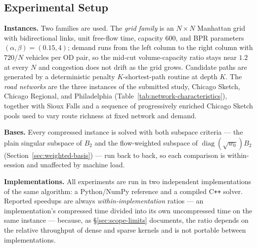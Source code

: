 \documentclass[11pt]{article}
\newif\ifshownotes \shownotesfalse
\newcommand{\conote}[1]{\ifshownotes{\color{red}\small\textsf{[Note to co-authors: #1]}}\fi}
\begin{document}
\conote{This section is a full rewrite rather than an update of the submitted one, so it is
set in black and red is reserved for these notes. The organizing change is that it leads with
a cost model and then tests it, instead of reporting parameter sweeps. Referee~1's own
diagnosis --- that the dense $(n-s)\times r$ nonnegativity block caps the gain --- is exactly
what the model formalizes, which is deliberate.}


\subsection{Experimental Setup}
\label{sec:setup}


\textbf{Instances.} Two families are used. The \emph{grid family} is an $N\times N$
Manhattan grid with bidirectional links, unit free-flow time, capacity $600$, and BPR
parameters $(\alpha,\beta)=(0.15,4)$; demand runs from the left column to the right column
with $720/N$ vehicles per OD pair, so the mid-cut volume-capacity ratio stays near $1.2$ at
every $N$ and congestion does not drift as the grid grows. Candidate paths are generated by
a deterministic penalty $K$-shortest-path routine at depth $K$. The \emph{road networks} are
the three instances of the submitted study, Chicago Sketch, Chicago Regional, and
Philadelphia (Table~\ref{tab:network-characteristics}), together with Sioux Falls and a
sequence of progressively enriched Chicago Sketch pools used to vary route richness at fixed
network and demand.

\textbf{Bases.} Every compressed instance is solved with both subspace criteria --- the plain
singular subspace of $B_2$ and the flow-weighted subspace of
$\operatorname{diag}(\sqrt{w_0})B_2$ (Section~\ref{sec:weighted-basis}) --- run back to back, so
each comparison is within-session and unaffected by machine load.

\textbf{Implementations.} All experiments are run in two independent implementations of the
same algorithm: a Python/NumPy reference and a compiled C\texttt{++} solver. Reported
speedups are always \emph{within-implementation} ratios --- an implementation's compressed
time divided into its own uncompressed time on the same instance --- because, as
\S\ref{sec:scope-limits} documents, the ratio depends on the relative throughput of dense and
sparse kernels and is not portable between implementations.
\end{document}
